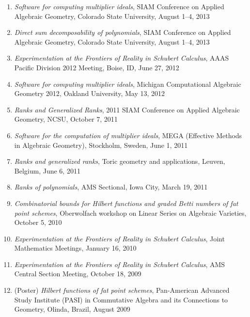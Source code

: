 \documentclass[12pt]{article}
\begin{document}
\begin{enumerate}
\item \textit{Software for computing multiplier ideals},
SIAM Conference on Applied Algebraic Geometry,
Colorado State University,
August 1--4, 2013

\item \textit{Direct sum decomposability of polynomials},
SIAM Conference on Applied Algebraic Geometry,
Colorado State University,
August 1--4, 2013

\item \textit{Experimentation at the Frontiers of Reality in Schubert Calculus},
AAAS Pacific Division 2012 Meeting,
Boise, ID, June 27, 2012

\item \textit{Software for computing multiplier ideals},
Michigan Computational Algebraic Geometry 2012,
Oakland University, May 13, 2012

\item \textit{Ranks and Generalized Ranks},
2011 SIAM Conference on Applied Algebraic Geometry,
NCSU, October 7, 2011

\item \textit{Software for the computation of multiplier ideals},
MEGA (Effective Methods in Algebraic Geometry), Stockholm, Sweden, June 1, 2011

\item \textit{Ranks and generalized ranks},
Toric geometry and applications, Leuven, Belgium, June 6, 2011

\item \textit{Ranks of polynomials}, AMS Sectional, Iowa City, March 19, 2011

\item \textit{Combinatorial bounds for Hilbert functions and graded Betti numbers of fat point schemes},
Oberwolfach workshop on Linear Series on Algebraic Varieties, October 5, 2010

\item \textit{Experimentation at the Frontiers of Reality in Schubert Calculus},
Joint Mathematics Meetings, January 16, 2010

\item \textit{Experimentation at the Frontiers of Reality in Schubert Calculus},
AMS Central Section Meeting, October 18, 2009

\item (Poster) \textit{Hilbert functions of fat point schemes},
Pan-American Advanced Study Institute (PASI) 
in 
Commutative Algebra and its Connections to Geometry,
Olinda, Brazil, August 2009


\end{enumerate}
\end{document}
